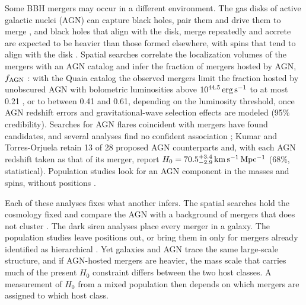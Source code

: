 \documentclass[aps,prd,reprint,twocolumn,superscriptaddress,nofootinbib,floatfix,nolongbibliography]{revtex4-2}
\newcommand{\kms}{{\rm km\,s^{-1}\,Mpc^{-1}}}
\newcommand{\fagn}{f_{\rm AGN}}
\begin{document}
Some BBH mergers may occur in a different environment. The gas disks of
active galactic nuclei (AGN) can capture black holes, pair them and drive
them to merge \cite{Bartos:2016dgn}, and black
holes that align with the disk, merge repeatedly and accrete are expected to
be heavier than those formed elsewhere, with spins that tend to align with
the disk \cite{Yang:2019okq,McKernan:2021nwk}. Spatial searches correlate the localization
volumes of the mergers with an AGN catalog and infer the fraction of mergers
hosted by AGN, $\fagn$ \cite{Bartos:2017ggb}: with the Quaia catalog
\cite{Storey-Fisher:2023gca} the observed mergers limit the fraction hosted
by unobscured AGN with bolometric luminosities above $10^{44.5}\,{\rm
erg\,s^{-1}}$ to at most 0.21 \cite{Veronesi:2024tef}, or to between 0.41 and
0.61, depending on the luminosity threshold, once AGN redshift errors and
gravitational-wave selection effects are modeled \cite{Pouw:2026lar} (95\%
credibility). Searches for AGN flares coincident with mergers have found
candidates, and several analyses find no confident association
\cite{Graham:2020gwr,Graham:2022xxu,Palmese:2021wcv,Veronesi:2024pjq};
Kumar and Torres-Orjuela \cite{Kumar:2026bqt} retain 13 of 28 proposed AGN
counterparts and, with each AGN redshift taken as that of its merger, report
$H_0=70.5^{+3.4}_{-2.9}\,\kms$ (68\%, statistical). Population studies look
for an AGN component in the masses and spins, without positions
\cite{Bartos:2026xlt}.

Each of these analyses fixes what another infers. The spatial searches hold
the cosmology fixed and compare the AGN with a background of mergers that
does not cluster \cite{Veronesi:2024tef,Zhu:2025rdv,Pouw:2026lar}. The dark
siren analyses
place every merger in a galaxy. The population studies leave positions out,
or bring them in only for mergers already identified as hierarchical
\cite{Moncrieff:2025xle}. Yet galaxies and
AGN trace the same large-scale structure, and if AGN-hosted mergers are
heavier, the mass scale that carries much of the present $H_0$ constraint
differs between the two host classes. A measurement of $H_0$ from a mixed population then depends on which
mergers are assigned to which host class.
\end{document}
